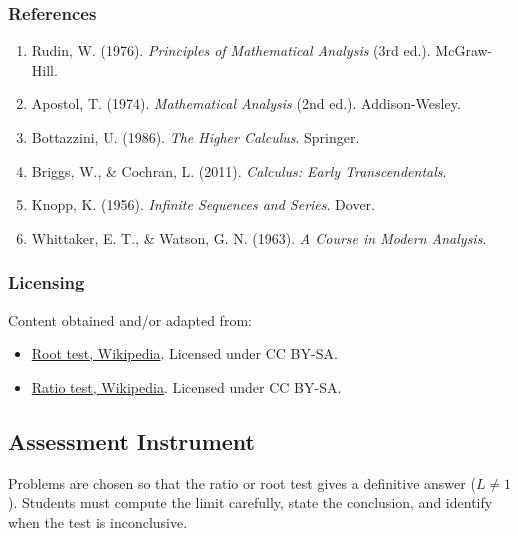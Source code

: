 \subsubsection{References}
\label{sss:refe-44a2}

\begin{enumerate}
\item Rudin, W. (1976). \textit{Principles of Mathematical Analysis} (3rd ed.). McGraw-Hill.
\item Apostol, T. (1974). \textit{Mathematical Analysis} (2nd ed.). Addison-Wesley.
\item Bottazzini, U. (1986). \textit{The Higher Calculus}. Springer.
\item Briggs, W., \& Cochran, L. (2011). \textit{Calculus: Early Transcendentals}.
\item Knopp, K. (1956). \textit{Infinite Sequences and Series}. Dover.
\item Whittaker, E. T., \& Watson, G. N. (1963). \textit{A Course in Modern Analysis}.
\end{enumerate}

\subsubsection{Licensing}
\label{sss:lice-7352}

Content obtained and/or adapted from:

\begin{itemize}
\item \href{https://en.wikipedia.org/wiki/Root_test}{Root test, Wikipedia}. Licensed under CC BY-SA.
\item \href{https://en.wikipedia.org/wiki/Ratio_test}{Ratio test, Wikipedia}. Licensed under CC BY-SA.
\end{itemize}

\subsection{Assessment Instrument}
\label{ssec:rati-8609}

Problems are chosen so that the ratio or root test gives a definitive answer ($L \ne 1$). Students must compute the limit carefully, state the conclusion, and identify when the test is inconclusive.

